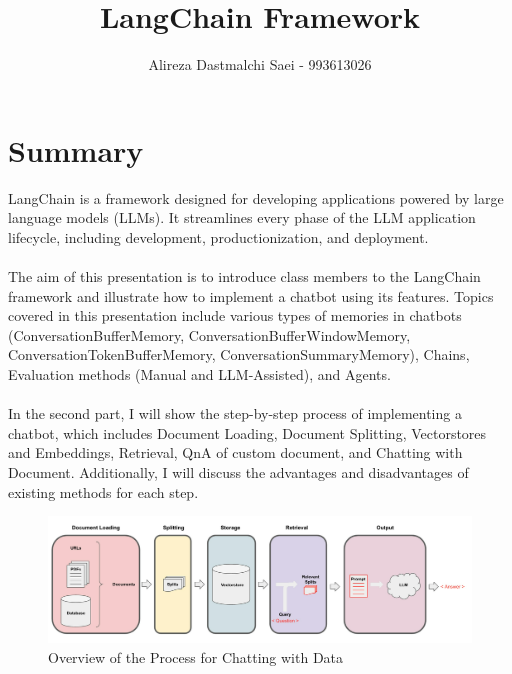 \documentclass{article}
\title{\textbf{\Huge LangChain Framework}}
\author{Alireza Dastmalchi Saei - 993613026}
\begin{document}
\maketitle

\section*{Summary}
LangChain is a framework designed for developing applications powered by large language models (LLMs). It streamlines every phase of the LLM application lifecycle, including development, productionization, and deployment.\\\\
The aim of this presentation is to introduce class members to the LangChain framework and illustrate how to implement a chatbot using its features. Topics covered in this presentation include various types of memories in chatbots (ConversationBufferMemory, ConversationBufferWindowMemory, ConversationTokenBufferMemory, ConversationSummaryMemory), Chains, Evaluation methods (Manual and LLM-Assisted), and Agents.\\\\
In the second part, I will show the step-by-step process of implementing a chatbot, which includes Document Loading, Document Splitting, Vectorstores and Embeddings, Retrieval, QnA of custom document, and Chatting with Document. Additionally, I will discuss the advantages and disadvantages of existing methods for each step. 

\begin{figure}[htbp]
    \centering
    \includegraphics[width=1\textwidth]{Images/Pipeline.png}
    \caption{Overview of the Process for Chatting with Data}
    \label{fig:CHTBT}
\end{figure}
\end{document}
